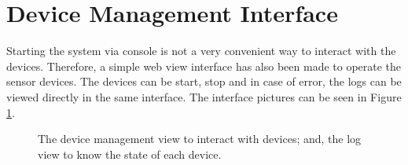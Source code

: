 \section{Device Management Interface}
Starting the system via console is not a very convenient way to interact with the devices. Therefore, a simple web view interface has also been made to operate the sensor devices. The devices can be start, stop and in case of error, the logs can be viewed directly in the same interface. The interface pictures can be seen in Figure \ref{fig:web_int_dev}.


\begin{figure}%
	\centering
	
	\hspace{15pt}%
	\caption[The device management interface.]{
		 The device management view to interact with devices; and,
		 the log view to know the state of each device.}%
	\label{fig:web_int_dev}%
\end{figure}


